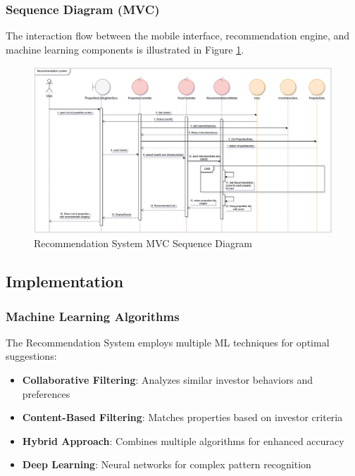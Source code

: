 \newpage
\subsubsection{Sequence Diagram (MVC)}
The interaction flow between the mobile interface, recommendation engine, and machine learning components is illustrated in Figure \ref{fig:recommendation-sequence-mvc}.

\begin{figure}[htbp]
    \centering
    \includegraphics[width=1\textwidth]{images/recommendation_sequence_mvc.png}
    \caption{Recommendation System MVC Sequence Diagram}
    \label{fig:recommendation-sequence-mvc}
\end{figure}

\subsection{Implementation}
\subsubsection{Machine Learning Algorithms}
The Recommendation System employs multiple ML techniques for optimal suggestions:

\begin{itemize}
    \item \textbf{Collaborative Filtering}: Analyzes similar investor behaviors and preferences
    \item \textbf{Content-Based Filtering}: Matches properties based on investor criteria
    \item \textbf{Hybrid Approach}: Combines multiple algorithms for enhanced accuracy
    \item \textbf{Deep Learning}: Neural networks for complex pattern recognition
\end{itemize}


